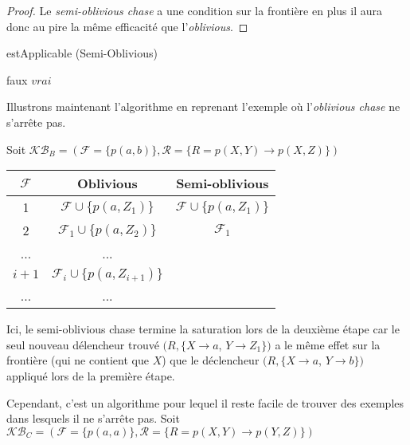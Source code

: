 \begin{proof} Le \textit{semi-oblivious chase} a une condition sur la frontière en plus il aura donc au pire la même efficacité que l'\textit{oblivious}.
\end{proof}

\begin{algorithm}[H]\label{algo:est_applicable_semi_oblivious}
\caption{estApplicable (Semi-Oblivious)}
\SetAlgoLined
\DontPrintSemicolon
{}
    {
        \Return faux
    }
\Return $vrai$
\end{algorithm}
Illustrons maintenant l'algorithme en reprenant l'exemple où l'\textit{oblivious chase} ne s'arrête pas.
\par Soit $\mathcal{KB}_B = (\mathcal{F} = \{p(a,b)\}, \mathcal{R} = \{R = p(X,Y) \rightarrow p(X,Z) \})$

\begin{center}
\begin{tabular}{|c|c|c|}
    \hline
    $\mathcal{F}$ & Oblivious & Semi-oblivious \\ 
    \hline
    1 &$\mathcal{F} \cup \{p(a, Z_1)\}$ & $\mathcal{F} \cup \{p(a, Z_1)\} $\\ 
    \hline
    2 &$\mathcal{F}_1 \cup \{p(a, Z_2)\}$ &$\mathcal{F}_1$\\
    \hline
    ... & ... & \\
    \hline
    $i+1$ & $\mathcal{F}_i \cup \{p(a, Z_{i+1})\} $& \\
     \hline
     ... & ... & \\
     \hline
\end{tabular}
\end{center}

Ici, le semi-oblivious chase termine la saturation lors de la deuxième étape car le seul nouveau délencheur trouvé $(R,\{X \rightarrow a$, $Y \rightarrow Z_1\})$ a le même effet sur la frontière (qui ne contient que $X$) que le déclencheur $(R,\{X \rightarrow a$, $Y \rightarrow b\})$ appliqué lors de la première étape.  

\par Cependant, c'est un algorithme pour lequel il reste facile de trouver des exemples dans lesquels il ne s'arrête pas.
Soit $\mathcal{KB}_C = (\mathcal{F} = \{p(a,a)\}, \mathcal{R} = \{R = p(X,Y) \rightarrow p(Y,Z) \})$

